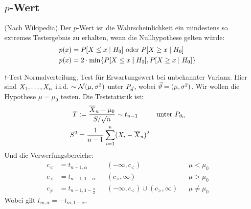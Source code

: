 \subsection{$p$-Wert}
(Nach Wikipedia) Der $p$-Wert ist die Wahrscheinlichkeit ein mindestens
so extremes Testergebnis zu erhalten, wenn die Nullhypothese gelten würde:
\begin{align*}
  p (x) & = P[X \leq x \; | \; H_0] \text{   oder   } P[X \geq x \; | \; H_0]   \\
  p (x) & = 2 \cdot \min \{ P[X \leq x \; | \; H_0], P[X \geq x \; | \; H_0] \}
\end{align*}
\begin{definition}{$t$-Test}
  \color{red} Normalverteilung, Test für Erwartungswert bei unbekannter Varianz. \color{black} Hier sind
  $X_1, \dots, X_n$ i.i.d. $\sim \mathcal{N} (\mu, \sigma^2)$ unter $P_{\vec{\vartheta}}$, wobei
  $\vec{\vartheta} = (\mu, \sigma^2)$. Wir wollen die Hypothese $\mu = \mu_0$ testen.
  Die Teststatistik ist:
  \begin{align*}
    T   & := \frac{\overline{X}_n - \mu_0}{S / \sqrt{n}} \sim t_{n-1}
        &                                                             & \text{unter } P_{\vartheta_0} \\
    S^2 & = \frac{1}{n-1} \sum_{i = 1}^n  (X_i - \overline{X}_n)^2
  \end{align*}
  Und die Verwerfungsbereiche:
  \begin{align*}
    c_<      & = t_{n-1, \alpha}               &  & (-\infty, c_<)                     &  & \mu < \mu_0    \\
    c_>      & = t_{n-1, 1 - \alpha}           &  & (c_>, \infty)                      &  & \mu > \mu_0    \\
    c_{\neq} & = t_{n-1, 1 - \frac{\alpha}{2}} &  & (-\infty, c_<) \cup  (c_>, \infty) &  & \mu \neq \mu_0
  \end{align*}
  Wobei gilt $t_{m, \alpha} = -t_{m, 1 - \alpha}$.
  \end{definition}
